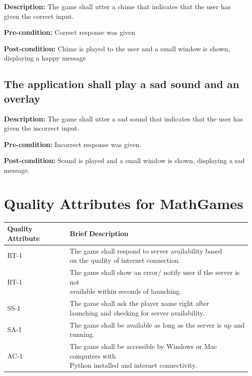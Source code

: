 \documentclass[12pt]{article}
\begin{document}
\begin{flushleft}
\textbf{Description:} The game shall utter a chime that indicates that the user has given the correct input.

\textbf{Pre-condition:} Correct response was given

\textbf{Post-condition:} Chime is played to the user and a small window is shown, displaying a happy message


\subsection{The application shall play a sad sound and an overlay}

\textbf{Description:} The game shall utter a sad sound that indicates that the user has given the incorrect input.

\textbf{Pre-condition:} Incorrect response was given.

\textbf{Post-condition:} Sound is played and a small window is shown, displaying a sad message.

\end{flushleft}

\newpage

\section{Quality Attributes for MathGames}

\begin{table}[H]
\begin{tabular}{@{}|l|l|@{}}
\toprule
\textbf{Quality Attribute} & \textbf{Brief Description} \\ \midrule
RT-1 & \makecell{The game shall respond to server availability based \\ on the quality of internet connection.} \\ \midrule
RT-1 & \makecell{The game shall show an error/ notify user if the server is not \\ available within seconds of launching.} \\ \midrule
SS-1 & \makecell{The game shall ask the player name right after \\ launching and checking for server availability.} \\ \midrule
SA-1 & The game shall be available as long as the server is up and running. \\ \midrule
AC-1 & \makecell{The game shall be accessible by Windows or Mac computers with \\ Python installed and internet connectivity}. \\ \bottomrule
\end{tabular}
\end{table}
\end{document}
